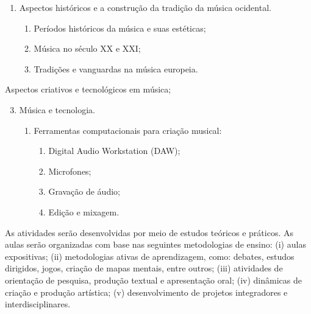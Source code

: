 \begin{pud}
\begin{description}[itemsep=0em]
\begin{enumerate}[itemsep=0em, topsep=0em]
				\item Aspectos históricos e a construção da tradição da música ocidental.
				\begin{enumerate}
                	\item Períodos históricos da música e suas estéticas;
                	\item Música no século XX e XXI;
					\item Tradições e vanguardas na música europeia.
                \end{enumerate}
	        \end{enumerate}
	        
	    \item[UNIDADE II:] Aspectos criativos e tecnológicos em música;
	    	
	        \begin{enumerate}[itemsep=0em, topsep=0em]
				\setcounter{enumi}{2}
				\item Música e tecnologia.
				
				\begin{enumerate}[itemsep=0em, topsep=0em]
					\item Ferramentas computacionais para criação musical:
					
					\begin{enumerate}[itemsep=0em, topsep=0.25em]
                		\item Digital Audio Workstation (DAW);
    					\item Microfones;
    					\item Gravação de áudio;
    					\item Edição e mixagem.
                	\end{enumerate}
                	
				\end{enumerate}
				
	        \end{enumerate}
	        
	
	\end{description}
	
	\clearpage
	\metodologia
	As atividades serão desenvolvidas por meio de estudos teóricos e práticos. As aulas serão organizadas com base nas seguintes metodologias de ensino: (i) aulas expositivas; (ii) metodologias ativas de aprendizagem, como: debates, estudos dirigidos, jogos, criação de mapas mentais, entre outros; (iii) atividades de orientação de pesquisa, produção textual e apresentação oral; (iv) dinâmicas de criação e produção artística; (v) desenvolvimento de projetos integradores e interdisciplinares.


\end{pud}
